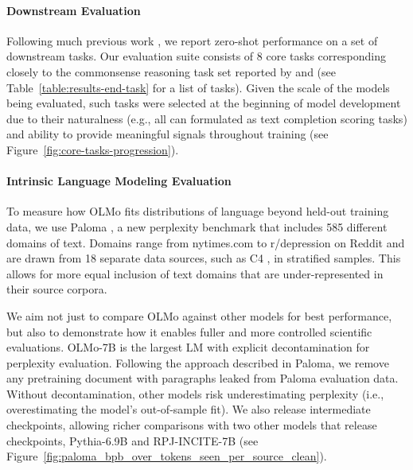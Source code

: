 \documentclass[11pt]{article}
\newcommand{\olmo}{OLMo\xspace}
\newcommand{\model}{OLMo-7B\xspace}
\begin{document}
\paragraph{Downstream Evaluation}
\label{sec:evaluation-downstream}
Following much previous work \citep[][\emph{inter alia}]{Brown2020LanguageMA,gpt-neox-20b,touvron2023llama1,touvron2023llama2}, we report zero-shot performance on a set of downstream tasks. Our evaluation suite consists of 8 core tasks corresponding closely to the commonsense reasoning task set reported by \citet{touvron2023llama1} and \citet{touvron2023llama2} (see Table~\ref{table:results-end-task} for a list of tasks). Given the scale of the models being evaluated, such tasks were selected at the beginning of model development due to their naturalness (e.g., all can formulated as text completion scoring tasks) and ability to provide meaningful signals throughout training (see Figure~\ref{fig:core-tasks-progression}). 



\paragraph{Intrinsic Language Modeling Evaluation}

To measure how OLMo fits distributions of language beyond held-out training data, we use Paloma \citep{magnusson2023paloma}, a new perplexity benchmark that includes 585 different domains of text. Domains range from nytimes.com to r/depression on Reddit and are drawn from 18 separate data sources, such as C4 \citep{raffel2020exploring}, in stratified samples. This allows for more equal inclusion of text domains that are under-represented in their source corpora. 

We aim not just to compare \olmo against other models for best performance, but also to demonstrate how it enables fuller and more controlled scientific evaluations. \model is the largest LM with explicit decontamination for perplexity evaluation. Following the approach described in Paloma, we remove any pretraining document with paragraphs leaked from Paloma evaluation data. Without decontamination, other models risk underestimating perplexity (i.e., overestimating the model's out-of-sample fit).  We also release intermediate checkpoints, allowing richer comparisons with two other models that release checkpoints, Pythia-6.9B \citep{pmlr-v202-biderman23a} and RPJ-INCITE-7B \citep{together2023redpajama} (see Figure~\ref{fig:paloma_bpb_over_tokens_seen_per_source_clean}). 
\end{document}
